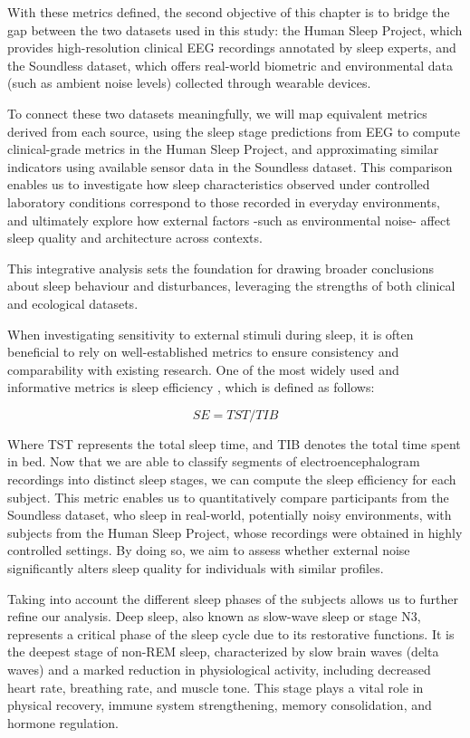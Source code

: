 With these metrics defined, the second objective of this chapter is to bridge the gap between the two datasets used in this study: the Human Sleep Project, which provides high-resolution clinical EEG recordings annotated by sleep experts, and the Soundless dataset, which offers real-world biometric and environmental data (such as ambient noise levels) collected through wearable devices.

To connect these two datasets meaningfully, we will map equivalent metrics derived from each source, using the sleep stage predictions from EEG to compute clinical-grade metrics in the Human Sleep Project, and approximating similar indicators using available sensor data in the Soundless dataset. This comparison enables us to investigate how sleep characteristics observed under controlled laboratory conditions correspond to those recorded in everyday environments, and ultimately explore how external factors -such as environmental noise- affect sleep quality and architecture across contexts.

This integrative analysis sets the foundation for drawing broader conclusions about sleep behaviour and disturbances, leveraging the strengths of both clinical and ecological datasets.

When investigating sensitivity to external stimuli during sleep, it is often beneficial to rely on well-established metrics to ensure consistency and comparability with existing research. One of the most widely used and informative metrics is sleep efficiency \cite{efficiency}, which is defined as follows:

\[ SE = TST / TIB \]

Where TST represents the total sleep time, and TIB denotes the total time spent in bed. Now that we are able to classify segments of electroencephalogram recordings into distinct sleep stages, we can compute the sleep efficiency for each subject. This metric enables us to quantitatively compare participants from the Soundless dataset, who sleep in real-world, potentially noisy environments, with subjects from the Human Sleep Project, whose recordings were obtained in highly controlled settings. By doing so, we aim to assess whether external noise significantly alters sleep quality for individuals with similar profiles.

Taking into account the different sleep phases of the subjects allows us to further refine our analysis. Deep sleep, also known as slow-wave sleep or stage N3, represents a critical phase of the sleep cycle due to its restorative functions. It is the deepest stage of non-REM sleep, characterized by slow brain waves (delta waves) and a marked reduction in physiological activity, including decreased heart rate, breathing rate, and muscle tone. This stage plays a vital role in physical recovery, immune system strengthening, memory consolidation, and hormone regulation.


